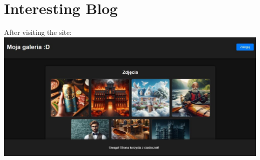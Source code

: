 \documentclass{article}
\begin{document}
\newpage
\section{Interesting Blog}
After visiting the site:
\vspace{3mm} \\
\includegraphics[width=\textwidth]{"image38.jpeg"}
\vspace{3mm}
\end{document}
